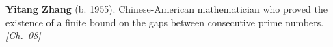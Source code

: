 \textbf{Yitang Zhang} (b. 1955). Chinese-American mathematician who proved the existence of a finite bound on the gaps between consecutive prime numbers. \emph{[Ch.~\hyperref[ch:boundedprimegaps]{08}]}

